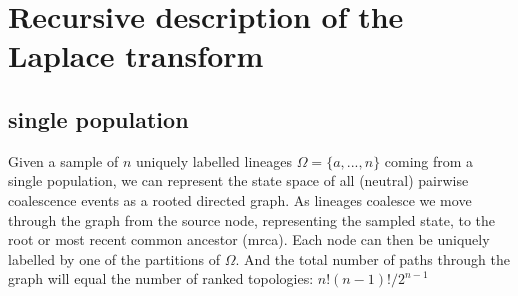 \documentclass[10pt, a4]{article}
\begin{document}

\section{Recursive description of the Laplace transform} \label{GF_description}
\subsection{single population}

Given a sample of $n$ uniquely labelled lineages $\Omega = \{a, ..., n\}$ coming from a single population, we can represent the state space of all (neutral) pairwise coalescence events as a rooted directed graph. As lineages coalesce we move through the graph from the source node, representing the sampled state, to the root or most recent common ancestor (mrca). Each node can then be uniquely labelled by one of the partitions of $\Omega$. And the total number of paths through the graph will equal the number of ranked topologies: $n!(n-1)!/2^{n-1}$ \citep{Lohse2016} %
\end{document}
